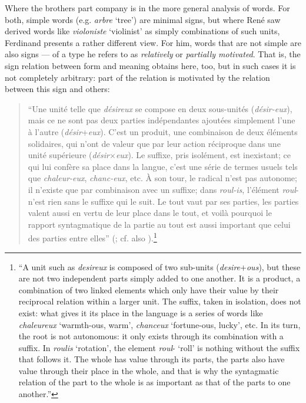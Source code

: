 \documentclass[output=paper]{langsci/langscibook}
\begin{document}
Where the brothers part company is in the more general analysis of
words.  For both, simple words (e.g. \emph{arbre} `tree') are minimal
signs, but where Ren\'e saw derived words like \emph{violoniste}
`violinist' as simply combinations of such units, Ferdinand presents a
rather different view.  For him, words that are not simple are also
signs --- of a type he refers to as \emph{relatively} or
\emph{partially motivated}. That is, the sign relation between form
and meaning obtains here, too, but in such cases it is not completely
arbitrary: part of the relation is motivated by the relation between
this sign and others:
\begin{quotation}
  ``Une unité telle que \emph{désireux} se compose en deux sous-unités
  (\emph{désir-eux}), mais ce ne sont pas deux parties indépendantes
  ajoutées simplement l’une à l’autre (\emph{désir}+\emph{eux}). C’est
  un produit, une combinaison de deux éléments solidaires, qui n’ont
  de valeur que par leur action réciproque dans une unité supérieure
  (\emph{désir}×\emph{eux}). Le suffixe, pris isolément, est
  inexistant; ce qui lui confère sa place dans la langue, c’est une
  série de termes usuels tels que \emph{chaleur-eux},
  \emph{chanc-eux}, etc. À son tour, le radical n’est pas autonome; il
  n’existe que par combinaison avec un suffixe; dans \emph{roul-is},
  l’élément \emph{roul}- n’est rien sans le suffixe qui le suit. Le
  tout vaut par ses parties, les parties valent aussi en vertu de leur
  place dans le tout, et voilà pourquoi le rapport syntagmatique de la
  partie au tout est aussi important que celui des parties entre
  elles'' (; cf. also
  ).\footnote{``A unit
    such as \emph{desireux} is composed of two sub-units
    (\emph{desire}+\emph{ous}), but these are not two independent parts simply added
    to one another. It is a product, a combination of two linked
    elements which only have their value by their reciprocal relation
    within a larger unit. The suffix, taken in isolation, does not
    exist: what gives it its place in the language is a series of
    words like \emph{chaleureux} ‘warmth-ous, warm’, \emph{chanceux}
    ‘fortune-ous, lucky’, etc. In its turn, the root is not
    autonomous: it only exists through its combination with a
    suffix. In \emph{roulis} ‘rotation’, the element \emph{roul}-
    ‘roll’ is nothing without the suffix that follows it. The whole
    has value through its parts, the parts also have value through
    their place in the whole, and that is why the syntagmatic relation
    of the part to the whole is as important as that of the parts to
    one another.''}
\end{quotation}
\end{document}
